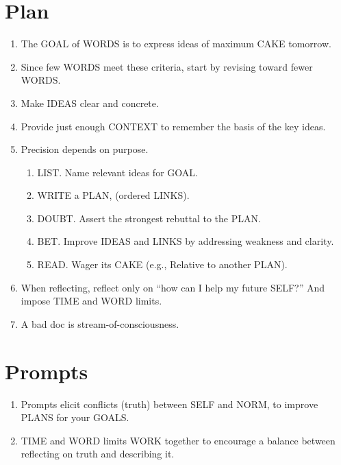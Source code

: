 \documentclass[
]{book}
\providecommand{\tightlist}{%
  \setlength{\itemsep}{0pt}\setlength{\parskip}{0pt}}
\begin{document}
\hypertarget{plan-3}{%
\section{Plan}\label{plan-3}}

\begin{enumerate}
\def\labelenumi{\arabic{enumi}.}
\setcounter{enumi}{14}
\tightlist
\item
  The GOAL of WORDS is to express ideas of maximum CAKE tomorrow.
\item
  Since few WORDS meet these criteria, start by revising toward fewer WORDS.
\item
  Make IDEAS clear and concrete.
\item
  Provide just enough CONTEXT to remember the basis of the key ideas.
\item
  Precision depends on purpose.

  \begin{enumerate}
  \def\labelenumii{\arabic{enumii}.}
  \tightlist
  \item
    LIST. Name relevant ideas for GOAL.
  \item
    WRITE a PLAN, (ordered LINKS).
  \item
    DOUBT. Assert the strongest rebuttal to the PLAN.
  \item
    BET. Improve IDEAS and LINKS by addressing weakness and clarity.
  \item
    READ. Wager its CAKE (e.g., Relative to another PLAN).
  \end{enumerate}
\item
  When reflecting, reflect only on ``how can I help my future SELF?'' And impose TIME and WORD limits.
\item
  A bad doc is stream-of-consciousness.
\end{enumerate}

\hypertarget{prompts}{%
\section{Prompts}\label{prompts}}

\begin{enumerate}
\def\labelenumi{\arabic{enumi}.}
\setcounter{enumi}{21}
\tightlist
\item
  Prompts elicit conflicts (truth) between SELF and NORM, to improve PLANS for your GOALS.
\item
  TIME and WORD limits WORK together to encourage a balance between reflecting on truth and describing it.
\end{enumerate}
\end{document}
